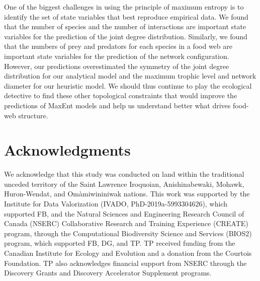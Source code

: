 One of the biggest challenges in using the principle of maximum entropy is to
identify the set of state variables that best reproduce empirical data. We found
that the number of species and the number of interactions are important state
variables for the prediction of the joint degree distribution. Similarly, we
found that the numbers of prey and predators for each species in a food web are
important state variables for the prediction of the network configuration.
However, our predictions overestimated the symmetry of the joint degree
distribution for our analytical model and the maximum trophic level and network
diameter for our heuristic model. We should thus continue to play the ecological
detective to find these other topological constraints that would improve the
predictions of MaxEnt models and help us understand better what drives food-web
structure.

\section{Acknowledgments}

We acknowledge that this study was conducted on land within the traditional
unceded territory of the Saint Lawrence Iroquoian, Anishinabewaki, Mohawk,
Huron-Wendat, and Omàmiwininiwak nations. This work was supported by the
Institute for Data Valorization (IVADO, PhD-2019a-5993304626), which supported
FB, and the Natural Sciences and Engineering Research Council of Canada (NSERC)
Collaborative Research and Training Experience (CREATE) program, through the
Computational Biodiversity Science and Services (BIOS2) program, which supported
FB, DG, and TP. TP received funding from the Canadian Institute for Ecology and
Evolution and a donation from the Courtois Foundation. TP also acknowledges
financial support from NSERC through the Discovery Grants and Discovery
Accelerator Supplement programs. 


\endinput
